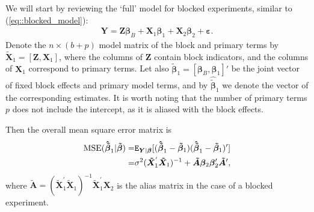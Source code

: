 
We will start by reviewing the `full' model for blocked experiments, similar to (\ref{eq::blocked_model}):
\begin{align*}
\bm{Y}=\bm{Z\beta}_{B}+\bm{X}_{1}\bm{\beta}_{1}+\bm{X}_{2}\bm{\beta}_{2}+\bm{\varepsilon}.
\end{align*}
Denote the $n\times(b+p)$ model matrix of the block and primary terms by $\tilde{\bm{X}}_{1}=[\bm{Z},\bm{X}_{1}]$, where the columns of $\bm{Z}$ contain block indicators, and the columns of $\bm{X}_{1}$ correspond to primary terms. Let also $\bm{\tilde{\beta}}_1=[\bm{\beta}_{B},\bm{\beta}_{1}]'$ be the joint vector of fixed block effects and primary model terms, and by $\bm{\hat{\tilde{\beta}}}_1$ we denote the vector of the corresponding estimates. It is worth noting that the number of primary terms $p$ does not include the intercept, as it is aliased with the block effects.

Then the overall mean square error matrix is
\begin{align}
\label{eq::MSE_b}
\mbox{MSE}(\bm{\hat{\tilde{\beta}}}_1|\bm{\tilde{\beta}})=&\mathtt{E}_{\bm{Y}|\bm{\beta}}[(\bm{\hat{\tilde{\beta}}}_1-\bm{\tilde{\beta}}_1)(\bm{\hat{\tilde{\beta}}}_1-\bm{\tilde{\beta}}_1)'] \notag\\=&\sigma^2(\bm{\tilde{X}}_1^{'}\bm{\tilde{X}}_1)^{-1}+\bm{\tilde{A}}\bm{\beta}_2\bm{\beta}_2'\bm{\tilde{A}}', 
\end{align}
where $\bm{\tilde{A}}=(\bm{\tilde{X}}_1^{'}\bm{\tilde{X}}_1)^{-1}\bm{\tilde{X}}_1^{'}\bm{X}_2$ is the alias matrix in the case of a blocked experiment.

